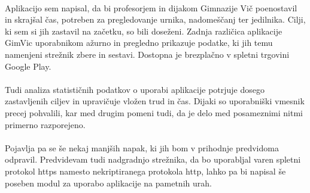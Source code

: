 \paragraph{}Aplikacijo sem napisal, da bi profesorjem in dijakom Gimnazije Vič poenostavil in skrajšal čas, potreben za pregledovanje urnika, nadomeščanj ter jedilnika. Cilji, ki sem si jih zastavil na začetku, so bili doseženi. Zadnja različica aplikacije GimVic uporabnikom ažurno in pregledno prikazuje podatke, ki jih temu namenjeni strežnik zbere in sestavi. Dostopna je brezplačno v spletni trgovini Google Play.

\paragraph{}Tudi analiza statističnih podatkov o uporabi aplikacije potrjuje dosego zastavljenih ciljev in upravičuje vložen trud in čas. Dijaki so uporabniški vmesnik precej pohvalili, kar med drugim pomeni tudi, da je delo med posameznimi nitmi primerno razporejeno.

\paragraph{}Pojavlja pa se še nekaj manjših napak, ki jih bom v prihodnje predvidoma odpravil. Predvidevam tudi nadgradnjo strežnika, da bo uporabljal varen spletni protokol https namesto nekriptiranega protokola http, lahko pa bi napisal še poseben modul za uporabo aplikacije na pametnih urah.
